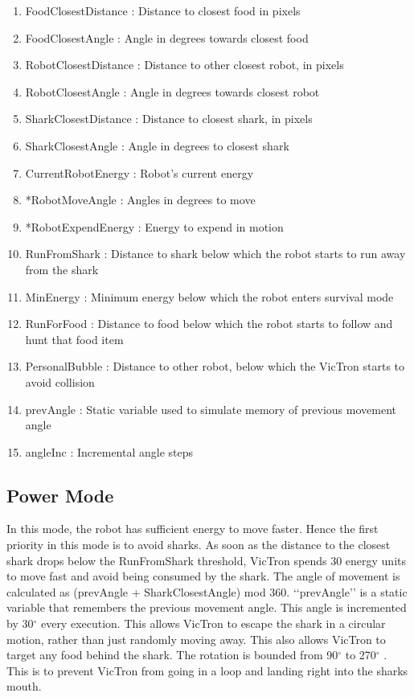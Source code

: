 \documentclass[12pt]{article}
\begin{document}
\begin{enumerate}
	\item FoodClosestDistance : Distance to closest food in pixels
	\item FoodClosestAngle : Angle in degrees towards closest food
	\item RobotClosestDistance : Distance to other closest robot, in pixels
	\item RobotClosestAngle :  Angle in degrees towards closest robot
	\item SharkClosestDistance : Distance to closest shark, in pixels
	\item SharkClosestAngle : Angle in degrees to closest shark
	\item CurrentRobotEnergy : Robot's current energy
	\item *RobotMoveAngle : Angles in degrees to move
	\item *RobotExpendEnergy : Energy to expend in motion
	\item RunFromShark : Distance to shark below which the robot starts to run away from the shark
	\item MinEnergy : Minimum energy below which the robot enters survival mode
	\item RunForFood : Distance to food below which the robot starts to follow and hunt that food item
	\item PersonalBubble : Distance to other robot, below which the VicTron starts to avoid collision
	\item prevAngle : Static variable used to simulate memory of previous movement angle
	\item angleInc : Incremental angle steps
\end{enumerate}

\subsection{Power Mode}
In this mode, the robot has sufficient energy to move faster. Hence the first priority in this mode is to avoid sharks. As soon as the distance to the closest shark drops below the RunFromShark threshold, VicTron spends 30 energy units to move fast and avoid being consumed by the shark. The angle of movement is calculated as (prevAngle + SharkClosestAngle) mod 360. \lq\lq{prevAngle}\rq\rq{} is a static variable that remembers the previous movement angle. This angle is incremented by 30$^{\circ}$ every execution. This allows VicTron to escape the shark in a circular motion, rather than just randomly moving away. This also allows VicTron to target any food behind the shark. The rotation is bounded from 90$^{\circ}$ to 270$^{\circ}$ . This is to prevent VicTron from going in a loop and landing right into the sharks mouth. \\
\end{document}
